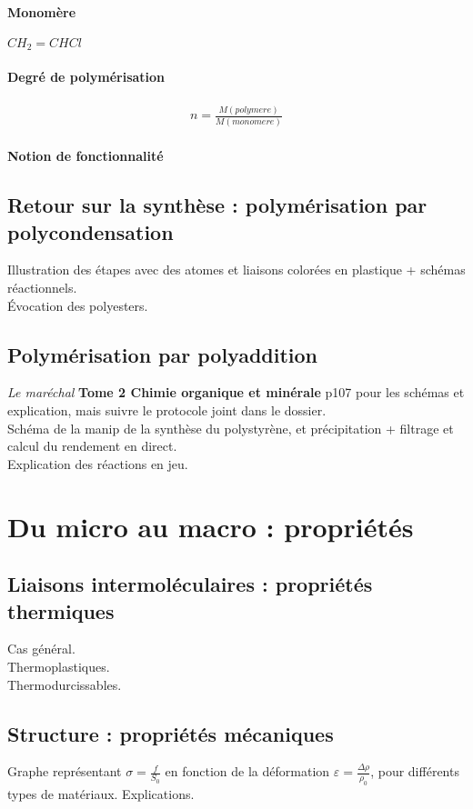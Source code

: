 \documentclass[12pt,prb,aps,epsf]{report}
\begin{document}
\paragraph{Monomère} $CH_2=CHCl$\\
\paragraph{Degré de polymérisation}
\begin{eqnarray}
n = \frac{M(polymere)}{M(monomere)}
\end{eqnarray}
\paragraph{Notion de fonctionnalité}

\subsection{Retour sur la synthèse : polymérisation par polycondensation}
Illustration des étapes avec des atomes et liaisons colorées en plastique + schémas réactionnels.\\
Évocation des polyesters.

\subsection{Polymérisation par polyaddition}
\textit{Le maréchal} \textbf{Tome 2 Chimie organique et minérale} p107 pour les schémas et explication, mais suivre le protocole joint dans le dossier.\\

Schéma de la manip de la synthèse du polystyrène, et précipitation + filtrage
 et calcul du rendement en direct.\\
 Explication des réactions en jeu.\\
 
\section{Du micro au macro : propriétés}
\subsection{Liaisons intermoléculaires : propriétés thermiques}
Cas général.\\
Thermoplastiques.\\
Thermodurcissables.
\subsection{Structure : propriétés mécaniques}
Graphe représentant $\sigma =  \frac{f}{S_0}$ en fonction de la déformation $\varepsilon = \frac{\Delta \rho}{\rho_0}$, pour différents types de matériaux. Explications.
\end{document}
